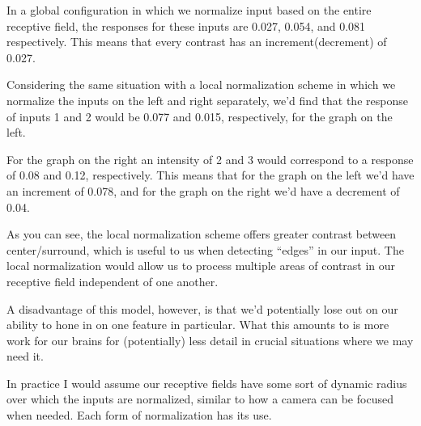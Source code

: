\documentclass[a4paper,12pt]{article}
\begin{document}
\vspace{2mm}

In a global configuration in which we normalize input based on the entire receptive field, the responses for these inputs are 0.027, 0.054, and 0.081 respectively. This means that every contrast has an increment(decrement) of 0.027. 

\vspace{2mm}

Considering the same situation with a local normalization scheme in which we normalize the inputs on the left and right separately, we'd find that the response of inputs 1 and 2 would be 0.077 and 0.015, respectively, for the graph on the left. 

\vspace{2mm}

For the graph on the right an intensity of 2 and 3 would correspond to a response of 0.08 and 0.12, respectively. This means that for the graph on the left we'd have an increment of 0.078, and for the graph on the right we'd have a decrement of 0.04. 

\vspace{2mm}

As you can see, the local normalization scheme offers greater contrast between center/surround, which is useful to us when detecting ``edges'' in our input. The local normalization would allow us to process multiple areas of contrast in our receptive field independent of one another. 

\vspace{2mm}

A disadvantage of this model, however, is that we'd potentially lose out on our ability to hone in on one feature in particular. What this amounts to is more work for our brains for (potentially) less detail in crucial situations where we may need it. 

\vspace{2mm}

In practice I would assume our receptive fields have some sort of dynamic radius over which the inputs are normalized, similar to how a camera can be focused when needed. Each form of normalization has its use. 
\end{document}
